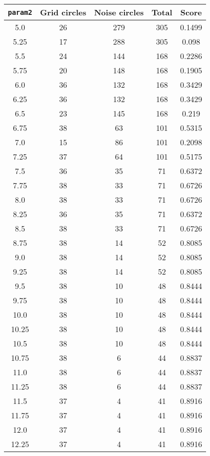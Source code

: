 \documentclass[letterpaper, 12pt]{article}
\begin{document}
\begin{longtable}{|c|c|c|c|c|}
\hline
\textbf{\texttt{param2}} & \textbf{Grid circles} & \textbf{Noise circles} & \textbf{Total} & \textbf{Score} \\
\hline
5.0 & 26 & 279 & 305 & 0.1499 \\
\hline
5.25 & 17 & 288 & 305 & 0.098 \\
\hline
5.5 & 24 & 144 & 168 & 0.2286 \\
\hline
5.75 & 20 & 148 & 168 & 0.1905 \\
\hline
6.0 & 36 & 132 & 168 & 0.3429 \\
\hline
6.25 & 36 & 132 & 168 & 0.3429 \\
\hline
6.5 & 23 & 145 & 168 & 0.219 \\
\hline
6.75 & 38 & 63 & 101 & 0.5315 \\
\hline
7.0 & 15 & 86 & 101 & 0.2098 \\
\hline
7.25 & 37 & 64 & 101 & 0.5175 \\
\hline
7.5 & 36 & 35 & 71 & 0.6372 \\
\hline
7.75 & 38 & 33 & 71 & 0.6726 \\
\hline
8.0 & 38 & 33 & 71 & 0.6726 \\
\hline
8.25 & 36 & 35 & 71 & 0.6372 \\
\hline
8.5 & 38 & 33 & 71 & 0.6726 \\
\hline
8.75 & 38 & 14 & 52 & 0.8085 \\
\hline
9.0 & 38 & 14 & 52 & 0.8085 \\
\hline
9.25 & 38 & 14 & 52 & 0.8085 \\
\hline
9.5 & 38 & 10 & 48 & 0.8444 \\
\hline
9.75 & 38 & 10 & 48 & 0.8444 \\
\hline
10.0 & 38 & 10 & 48 & 0.8444 \\
\hline
10.25 & 38 & 10 & 48 & 0.8444 \\
\hline
10.5 & 38 & 10 & 48 & 0.8444 \\
\hline
10.75 & 38 & 6 & 44 & 0.8837 \\
\hline
11.0 & 38 & 6 & 44 & 0.8837 \\
\hline
11.25 & 38 & 6 & 44 & 0.8837 \\
\hline
11.5 & 37 & 4 & 41 & 0.8916 \\
\hline
11.75 & 37 & 4 & 41 & 0.8916 \\
\hline
12.0 & 37 & 4 & 41 & 0.8916 \\
\hline
12.25 & 37 & 4 & 41 & 0.8916 \\

\end{longtable}
\end{document}
